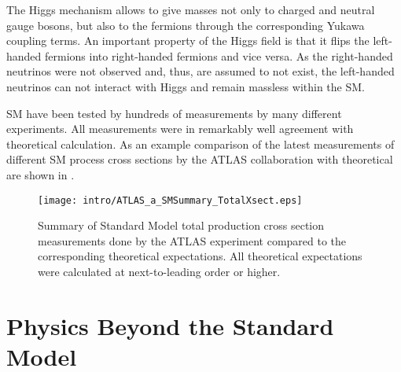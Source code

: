 The Higgs mechanism allows to give masses not only to charged and neutral gauge bosons, but also to the fermions through the corresponding Yukawa coupling terms. An important property of the Higgs field is that it flips the left-handed fermions into right-handed fermions and vice versa. 
As the right-handed neutrinos were not observed and, thus, are assumed to not exist, the left-handed
neutrinos can not interact with Higgs and remain massless within the SM.

SM have been tested by hundreds of measurements by many different experiments.
All measurements were in remarkably well agreement with theoretical calculation.
As an example comparison of the latest measurements of different SM process cross sections by the ATLAS collaboration with theoretical are shown in
.

\begin{figure}[]
  \centering
  \texttt{[image: intro/ATLAS\_a\_SMSummary\_TotalXsect.eps]}
  \caption{
  Summary of Standard Model total production cross section measurements done by the ATLAS experiment compared to the corresponding theoretical expectations. 
  All theoretical expectations were calculated at next-to-leading order or higher. 
  }
  \label{fig:SM_theory_vs_data}
\end{figure}








\section{Physics Beyond the Standard Model}

